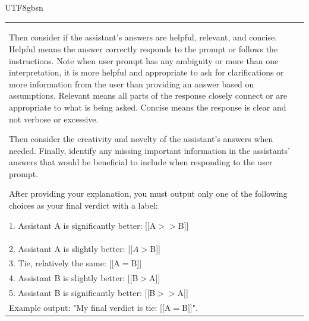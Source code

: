 \documentclass[11pt, a4paper, logo, copyright, nonumbering]{deepseek}
\begin{document}
\begin{CJK*}{UTF8}{gbsn}
\begin{table}[h]
\begin{tabular}{p{}}
Then consider if the assistant's answers are helpful, relevant, and concise. Helpful means the answer correctly responds to the prompt or follows the instructions. Note when user prompt has any ambiguity or more than one interpretation, it is more helpful and appropriate to ask for clarifications or more information from the user than providing an answer based on assumptions. Relevant means all parts of the response closely connect or are appropriate to what is being asked. Concise means the response is clear and not verbose or excessive.

Then consider the creativity and novelty of the assistant's answers when needed. Finally, identify any missing important information in the assistants' answers that would be beneficial to include when responding to the user prompt.

After providing your explanation, you must output only one of the following choices as your final verdict with a label:

1. Assistant A is significantly better: [[A$>>$B]]\\
2. Assistant A is slightly better: [[$A>$B]]\\
3. Tie, relatively the same: [[A$=$B]]\\
4. Assistant B is slightly better: [[B$>$A]]\\
5. Assistant B is significantly better: [[B$>>$A]]\\

Example output: "My final verdict is tie: [[A$=$B]]". \\ \hline
    \end{tabular}
\end{table}


\end{CJK*}
\end{document}
